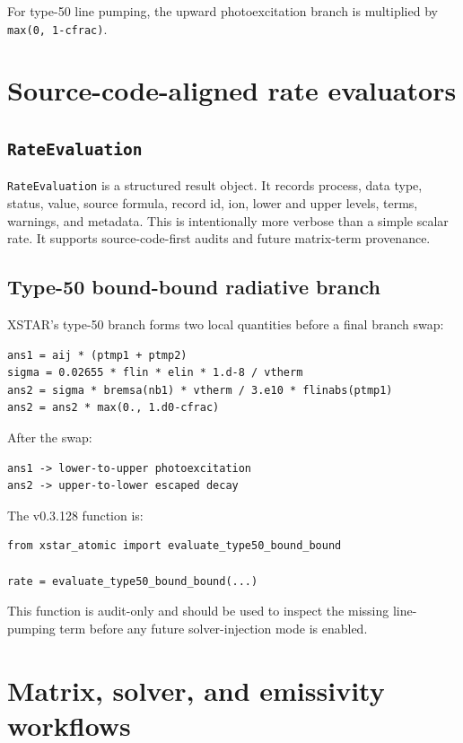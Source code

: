 \documentclass[11pt]{article}
\begin{document}
For type-50 line pumping, the upward photoexcitation branch is multiplied by \texttt{max(0, 1-cfrac)}.

\section{Source-code-aligned rate evaluators}

\subsection{\texttt{RateEvaluation}}

\texttt{RateEvaluation} is a structured result object. It records process, data type, status, value, source formula, record id, ion, lower and upper levels, terms, warnings, and metadata. This is intentionally more verbose than a simple scalar rate. It supports source-code-first audits and future matrix-term provenance.

\subsection{Type-50 bound-bound radiative branch}

XSTAR's type-50 branch forms two local quantities before a final branch swap:

\begin{lstlisting}[style=ctterminal]
ans1 = aij * (ptmp1 + ptmp2)
sigma = 0.02655 * flin * elin * 1.d-8 / vtherm
ans2 = sigma * bremsa(nb1) * vtherm / 3.e10 * flinabs(ptmp1)
ans2 = ans2 * max(0., 1.d0-cfrac)
\end{lstlisting}

After the swap:

\begin{lstlisting}[style=ctterminal]
ans1 -> lower-to-upper photoexcitation
ans2 -> upper-to-lower escaped decay
\end{lstlisting}

The v0.3.128 function is:

\begin{lstlisting}[style=ctpython]
from xstar_atomic import evaluate_type50_bound_bound

rate = evaluate_type50_bound_bound(...)
\end{lstlisting}

This function is audit-only and should be used to inspect the missing line-pumping term before any future solver-injection mode is enabled.

\section{Matrix, solver, and emissivity workflows}
\end{document}
